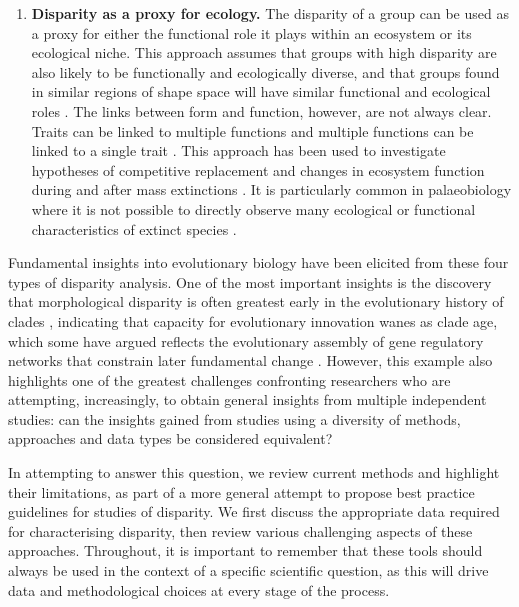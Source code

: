\documentclass[12pt,letterpaper]{article}
\begin{document}
\begin{enumerate}
	\item \textbf{Disparity as a proxy for ecology.} The disparity of a group can be used as a proxy for either the functional role it plays within an ecosystem or its ecological niche.
	This approach assumes that groups with high disparity are also likely to be functionally and ecologically diverse, and that groups found in similar regions of shape space will have similar functional and ecological roles \citep{Pierce2008, Friedman2010}.
	The links between form and function, however, are not always clear.
	Traits can be linked to multiple functions and multiple functions can be linked to a single trait \citep{Wainwright2005}.
	This approach has been used to investigate hypotheses of competitive replacement \citep{tyler2011detecting} and changes in ecosystem function during and after mass extinctions \citep{Friedman2010}.
	It is particularly common in palaeobiology where it is not possible to directly observe many ecological or functional characteristics of extinct species \citep{Wainwright2005}.

\end{enumerate}

Fundamental insights into evolutionary biology have been elicited from these four types of disparity analysis.
One of the most important insights is the discovery that morphological disparity is often greatest early in the evolutionary history of clades \citep{Foote1997, Erwin2007, Hughes2013}, indicating that capacity for evolutionary innovation wanes as clade age, which some have argued reflects the evolutionary assembly of gene regulatory networks that constrain later fundamental change \citep{Erwin2007, Hughes2013}.
However, this example also highlights one of the greatest challenges confronting researchers who are attempting, increasingly, to obtain general insights from multiple independent studies: can the insights gained from studies using a diversity of methods, approaches and data types be considered equivalent?

In attempting to answer this question, we review current methods and highlight their limitations, as part of a more general attempt to propose best practice guidelines for studies of disparity.
We first discuss the appropriate data required for characterising disparity, then review various challenging aspects of these approaches.
Throughout, it is important to remember that these tools should always be used in the context of a specific scientific question, as this will drive data and methodological choices at every stage of the process.
\end{document}
